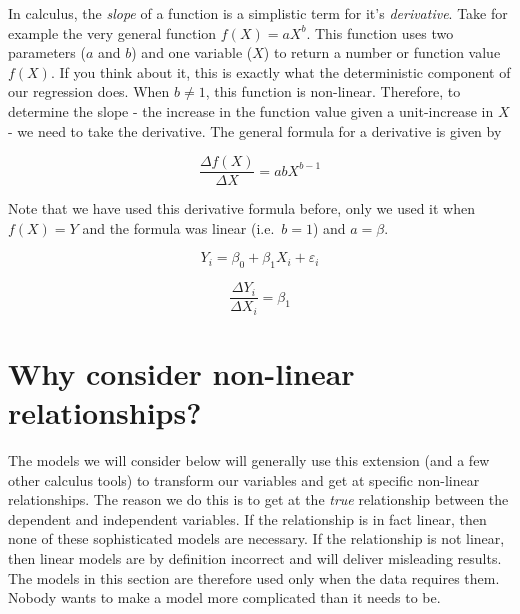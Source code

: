 \documentclass[
]{book}
\begin{document}
In calculus, the \emph{slope} of a function is a simplistic term for it's \emph{derivative}. Take for example the very general function \(f(X) = aX^b\). This function uses two parameters (\(a\) and \(b\)) and one variable (\(X\)) to return a number or function value \(f(X)\). If you think about it, this is exactly what the deterministic component of our regression does. When \(b\neq1\), this function is non-linear. Therefore, to determine the slope - the increase in the function value given a unit-increase in \(X\) - we need to take the derivative. The general formula for a derivative is given by

\[\frac{\Delta f(X)}{\Delta X}=abX^{b-1}\]

Note that we have used this derivative formula before, only we used it when \(f(X)=Y\) and the formula was linear (i.e.~\(b=1\)) and \(a = \beta\).

\[Y_i = \beta_0 + \beta_1 X_i + \varepsilon_i\]

\[\frac{\Delta Y_i}{\Delta X_i}=\beta_1\]

\hypertarget{why-consider-non-linear-relationships}{%
\section{Why consider non-linear relationships?}\label{why-consider-non-linear-relationships}}

The models we will consider below will generally use this extension (and a few other calculus tools) to transform our variables and get at specific non-linear relationships. The reason we do this is to get at the \emph{true} relationship between the dependent and independent variables. If the relationship is in fact linear, then none of these sophisticated models are necessary. If the relationship is not linear, then linear models are by definition incorrect and will deliver misleading results. The models in this section are therefore used only when the data requires them. Nobody wants to make a model more complicated than it needs to be.
\end{document}
